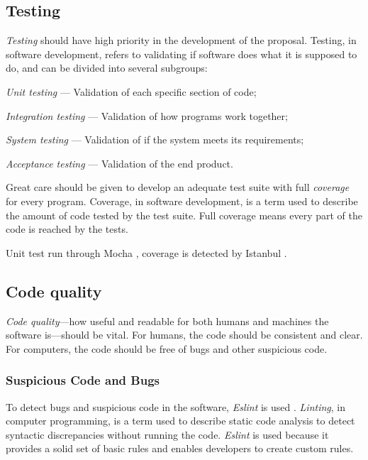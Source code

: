 \subsection{Testing}\label{testing}

\emph{Testing} should have high priority in the development of the proposal.
Testing, in software development, refers to validating if software does what
  it is supposed to do, and can be divided into several subgroups:

\begin{aenumerate}
\item\emph{Unit testing} --- Validation of each specific section of code;
\item\emph{Integration testing} --- Validation of how programs work together;
\item\emph{System testing} --- Validation of if the system meets its
  requirements;
\item\emph{Acceptance testing} --- Validation of the end product.
\end{aenumerate}

\noindent Great care should be given to develop an adequate test suite with
  full \emph{coverage} for every program.
Coverage, in software development, is a term used to describe the amount of
  code tested by the test suite.
Full coverage means every part of the code is reached by the tests.

Unit test run through Mocha \autocite{visionmedia/mocha-source-code},
  coverage is detected by Istanbul
  \autocite{gotwarlost/istanbul-source-code}.

\subsection{Code quality}\label{code-quality}

\emph{Code quality}---how useful and readable for both humans and machines
  the software is---should be vital. For humans, the code should be
  consistent and clear. For computers, the code should be free of bugs and
  other suspicious code.

\subsubsection{Suspicious Code and Bugs}\label{suspicious-code-and-bugs}

To detect bugs and suspicious code in the software, \emph{Eslint}
  is used \autocite{eslint/eslint-source-code}.
\emph{Linting}, in computer programming, is a term used to describe static
  code analysis to detect syntactic discrepancies without running the code.
\emph{Eslint} is used because it provides a solid set of basic rules and
  enables developers to create custom rules.

